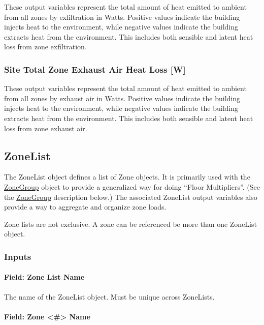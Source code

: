 These output variables represent the total amount of heat emitted to ambient from all zones by exfiltration in Watts. Positive values indicate the building injects heat to the environment, while negative values indicate the building extracts heat from the environment. This includes both sensible and latent heat loss from zone exfiltration.

\subsubsection{Site Total Zone Exhaust Air Heat Loss {[}W{]}}\label{site-total-exhaust-heat-transfer-rate-w}

These output variables represent the total amount of heat emitted to ambient from all zones by exhaust air in Watts. Positive values indicate the building injects heat to the environment, while negative values indicate the building extracts heat from the environment. This includes both sensible and latent heat loss from zone exhaust air.

\subsection{ZoneList}\label{zonelist}

The ZoneList object defines a list of Zone objects. It is primarily used with the \hyperref[zonegroup]{ZoneGroup} object to provide a generalized way for doing ``Floor Multipliers''. (See the \hyperref[zonegroup]{ZoneGroup} description below.) The associated ZoneList output variables also provide a way to aggregate and organize zone loads.

Zone lists are not exclusive. A zone can be referenced be more than one ZoneList object.

\subsubsection{Inputs}\label{inputs-1-045}

\paragraph{Field: Zone List Name}\label{field-zone-list-name-000}

The name of the ZoneList object. Must be unique across ZoneLists.

\paragraph{Field: Zone \textless{}\#\textgreater{} Name}\label{field-zone-1---zone-20-name}

